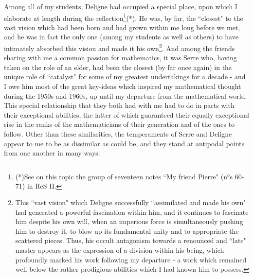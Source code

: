 Among all of my students, Deligne had occupied a special place, upon which I elaborate at length during the reflection\footnote{(*)See on this topic the group of seventeen notes ``My friend Pierre" (n$^o$s 60-71) in ReS II.}(*). He was, by far, the ``closest" to the vast vision which had been born and had grown within me long before we met, and he was in fact the only one (among my students as well as others) to have intimately absorbed this vision and made it his own\footnote{This ``vast vision" which Deligne successfully ``assimilated and made his own" had generated a powerful fascination within him, and it continues to fascinate him despite his own will, when an imperious force is simultaneously pushing him to destroy it, to blow up its fundamental unity and to appropriate the scattered pieces. Thus, his occult antagonism towards a renounced and ``late" master appears as the expression of a division within his being, which profoundly marked his work following my departure - a work which remained well below the rather prodigious abilities which I had known him to possess.}. And among the friends sharing with me a common passion for mathematics, it was Serre who, having taken on the role of an elder, had been the closest (by far once again) in the unique role of ``catalyst" for some of my greatest undertakings for a decade - and I owe him most of the great key-ideas which inspired my mathematical thought during the 1950s and 1960s, up until my departure from the mathematical world. This special relationship that they both had with me had to do in parts with their exceptional abilities, the latter of which guaranteed their equally exceptional rise in the ranks of the mathematicians of their generation and of the ones to follow. Other than these similarities, the temperaments of Serre and Deligne appear to me to be as dissimilar as could be, and they stand at antipodal points from one another in many ways. 


